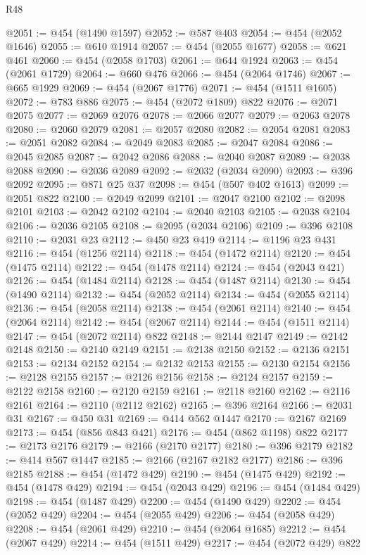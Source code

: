 \begin{lexlean}{R48}
\begin{coremodule}
@2051 := @454 (@1490 @1597)
@2052 := @587 @403
@2054 := @454 (@2052 @1646)
@2055 := @610 @1914
@2057 := @454 (@2055 @1677)
@2058 := @621 @461
@2060 := @454 (@2058 @1703)
@2061 := @644 @1924
@2063 := @454 (@2061 @1729)
@2064 := @660 @476
@2066 := @454 (@2064 @1746)
@2067 := @665 @1929
@2069 := @454 (@2067 @1776)
@2071 := @454 (@1511 @1605)
@2072 := @783 @886
@2075 := @454 (@2072 @1809) @822
@2076 := @2071 @2075
@2077 := @2069 @2076
@2078 := @2066 @2077
@2079 := @2063 @2078
@2080 := @2060 @2079
@2081 := @2057 @2080
@2082 := @2054 @2081
@2083 := @2051 @2082
@2084 := @2049 @2083
@2085 := @2047 @2084
@2086 := @2045 @2085
@2087 := @2042 @2086
@2088 := @2040 @2087
@2089 := @2038 @2088
@2090 := @2036 @2089
@2092 := @2032 (@2034 @2090)
@2093 := @396 @2092
@2095 := @871 @25 @37
@2098 := @454 (@507 @402 @1613)
@2099 := @2051 @822
@2100 := @2049 @2099
@2101 := @2047 @2100
@2102 := @2098 @2101
@2103 := @2042 @2102
@2104 := @2040 @2103
@2105 := @2038 @2104
@2106 := @2036 @2105
@2108 := @2095 (@2034 @2106)
@2109 := @396 @2108
@2110 := @2031 @23
@2112 := @450 @23 @419
@2114 := @1196 @23 @431
@2116 := @454 (@1256 @2114)
@2118 := @454 (@1472 @2114)
@2120 := @454 (@1475 @2114)
@2122 := @454 (@1478 @2114)
@2124 := @454 (@2043 @421)
@2126 := @454 (@1484 @2114)
@2128 := @454 (@1487 @2114)
@2130 := @454 (@1490 @2114)
@2132 := @454 (@2052 @2114)
@2134 := @454 (@2055 @2114)
@2136 := @454 (@2058 @2114)
@2138 := @454 (@2061 @2114)
@2140 := @454 (@2064 @2114)
@2142 := @454 (@2067 @2114)
@2144 := @454 (@1511 @2114)
@2147 := @454 (@2072 @2114) @822
@2148 := @2144 @2147
@2149 := @2142 @2148
@2150 := @2140 @2149
@2151 := @2138 @2150
@2152 := @2136 @2151
@2153 := @2134 @2152
@2154 := @2132 @2153
@2155 := @2130 @2154
@2156 := @2128 @2155
@2157 := @2126 @2156
@2158 := @2124 @2157
@2159 := @2122 @2158
@2160 := @2120 @2159
@2161 := @2118 @2160
@2162 := @2116 @2161
@2164 := @2110 (@2112 @2162)
@2165 := @396 @2164
@2166 := @2031 @31
@2167 := @450 @31
@2169 := @414 @562 @1447
@2170 := @2167 @2169
@2173 := @454 (@856 @843 @421)
@2176 := @454 (@862 @1198) @822
@2177 := @2173 @2176
@2179 := @2166 (@2170 @2177)
@2180 := @396 @2179
@2182 := @414 @567 @1447
@2185 := @2166 (@2167 @2182 @2177)
@2186 := @396 @2185
@2188 := @454 (@1472 @429)
@2190 := @454 (@1475 @429)
@2192 := @454 (@1478 @429)
@2194 := @454 (@2043 @429)
@2196 := @454 (@1484 @429)
@2198 := @454 (@1487 @429)
@2200 := @454 (@1490 @429)
@2202 := @454 (@2052 @429)
@2204 := @454 (@2055 @429)
@2206 := @454 (@2058 @429)
@2208 := @454 (@2061 @429)
@2210 := @454 (@2064 @1685)
@2212 := @454 (@2067 @429)
@2214 := @454 (@1511 @429)
@2217 := @454 (@2072 @429) @822

\end{coremodule}
\end{lexlean}
